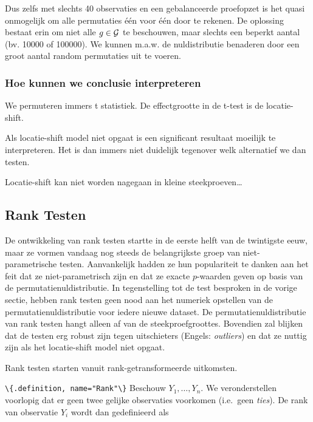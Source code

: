 \documentclass[
  12pt,dutch,coursenotes]{book}
\newcommand{\passthrough}[1]{#1}
\begin{document}
Dus zelfs met slechts 40 observaties en een gebalanceerde proefopzet is het quasi onmogelijk om alle permutaties één voor één door te rekenen.
De oplossing bestaat erin om niet alle \(g \in {\cal{G}}\) te beschouwen, maar slechts een beperkt aantal (bv. 10000 of 100000).
We kunnen m.a.w. de nuldistributie benaderen door een groot aantal random permutaties uit te voeren.

\hypertarget{hoe-kunnen-we-conclusie-interpreteren}{%
\subsubsection{Hoe kunnen we conclusie interpreteren}\label{hoe-kunnen-we-conclusie-interpreteren}}

We permuteren immers t statistiek. De effectgrootte in de t-test is de locatie-shift.

Als locatie-shift model niet opgaat is een significant resultaat moeilijk te interpreteren. Het is dan immers niet duidelijk tegenover welk alternatief we dan testen.

Locatie-shift kan niet worden nagegaan in kleine steekproeven\ldots{}

\hypertarget{rank-testen}{%
\subsection{Rank Testen}\label{rank-testen}}

De ontwikkeling van rank testen startte in de eerste helft van de twintigste eeuw, maar ze vormen vandaag nog steeds de belangrijkste groep van niet-parametrische testen. Aanvankelijk hadden ze hun populariteit te danken aan het feit dat ze niet-parametrisch zijn en dat ze exacte \(p\)-waarden geven op basis van de permutatienuldistributie. In tegenstelling tot de test besproken in de vorige sectie, hebben rank testen geen nood aan het numeriek opstellen van de permutatienuldistributie voor iedere nieuwe dataset. De permutatienuldistributie van rank testen hangt alleen af van de steekproefgroottes. Bovendien zal blijken dat de testen erg robust zijn tegen uitschieters (Engels: \emph{outliers}) en dat ze nuttig zijn als het locatie-shift model niet opgaat.

Rank testen starten vanuit rank-getransformeerde uitkomsten.

\passthrough{\lstinline!\{.definition, name="Rank"\}!}
Beschouw \(Y_1, \ldots, Y_n\). We veronderstellen voorlopig dat
er geen twee gelijke observaties voorkomen (i.e.~geen \emph{ties}).
De rank van observatie \(Y_i\) wordt dan
gedefinieerd als
\end{document}
